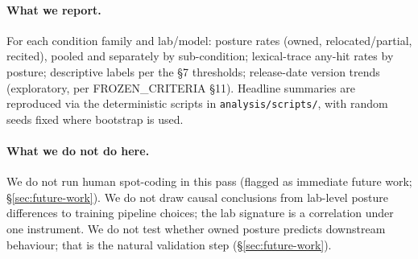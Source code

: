 \paragraph{What we report.}
For each condition family and lab/model: posture rates (owned, relocated/partial, recited), pooled and separately by sub-condition; lexical-trace any-hit rates by posture; descriptive labels per the \S7 thresholds; release-date version trends (exploratory, per FROZEN\_CRITERIA \S11). Headline summaries are reproduced via the deterministic scripts in \texttt{analysis/scripts/}, with random seeds fixed where bootstrap is used.

\paragraph{What we do not do here.}
We do not run human spot-coding in this pass (flagged as immediate future work; \S\ref{sec:future-work}). We do not draw causal conclusions from lab-level posture differences to training pipeline choices; the lab signature is a correlation under one instrument. We do not test whether owned posture predicts downstream behaviour; that is the natural validation step (\S\ref{sec:future-work}).
